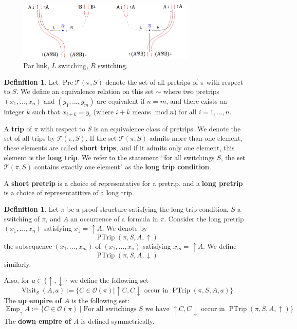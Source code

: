 \documentclass[12pt]{article}
\theoremstyle{plain}
\theoremstyle{definition}
\newtheorem{defn}[thm]{Definition} %
\newcommand{\call}[1]{\mathcal{#1}}
\begin{document}
\begin{figure}[h]
    \centering
    \includegraphics[width = 0.8\textwidth]{ParrSwitching.png}
    \caption{Par link, $L$ switching, $R$ switching.}
    \label{fig:parrswitching}
\end{figure}
\begin{defn}
Let $\operatorname{Pre}\call{T}(\pi,S)$ denote the set of all pretrips of $\pi$ with respect to $S$. We define an equivalence relation on this set $\sim$ where two pretrips $(x_1,...,x_n)$ and $(y_1,...,y_m)$ are equivalent if $n = m$, and there exists an integer $k$ such that $x_{i + k} = y_i$ (where $i + k$ means $\operatorname{mod} n$) for all $i = 1,...,n$.

A \textbf{trip} of $\pi$ with respect to $S$ is an equivalence class of pretrips. We denote the set of all trips by $\call{T}(\pi,S)$.  If the set $\call{T}(\pi,S)$ admits more than one element, these elements are called \textbf{short trips}, and if it admits only one element, this element is the \textbf{long trip}. We refer to the statement ``for all switchings $S$, the set $\call{T}(\pi,S)$ contains exactly one element" as the \textbf{long trip condition}.

A \textbf{short pretrip} is a choice of representative for a pretrip, and a \textbf{long pretrip} is a choice of representatitive of a long trip.
\end{defn}
\begin{defn}\label{def:pretrip_from_A}
Let $\pi$ be a proof-structure satisfying the long trip condition, $S$ a switching of $\pi$, and $A$ an occurrence of a formula in $\pi$. Consider the long pretrip $(x_1,...,x_n)$ satisfying $x_1 = \uparrow A$. We denote by
\begin{equation}
    \operatorname{PTrip}(\pi,S,A,\uparrow)
\end{equation}
the subsequence $(x_1,...,x_m)$ of $(x_1,...,x_n)$ satisfying $x_m = \uparrow A$. We define
\begin{equation}
    \operatorname{PTrip}(\pi, S, A, \downarrow)
\end{equation}
similarly.

Also, for $a \in \lbrace \uparrow,\downarrow\rbrace $ we define the following set
\begin{equation}
    \operatorname{Visit}_S(A,a) := \lbrace C \in \call{O}(\pi) \mid \uparrow C, C\downarrow \text{ occur in } \operatorname{PTrip}(\pi,S,A,a)\rbrace
\end{equation}
The \textbf{up empire of $A$} is the following set:
\begin{equation}
    \operatorname{Emp}_{\uparrow}A := \lbrace C \in \call{O}(\pi) \mid \text{For all switchings }S\text{ we have } \uparrow C, C\downarrow \text{ occur in } \operatorname{PTrip}(\pi,S, A,\uparrow)\rbrace
\end{equation}
The \textbf{down empire of $A$} is defined symmetrically.
\end{defn}
\end{document}
